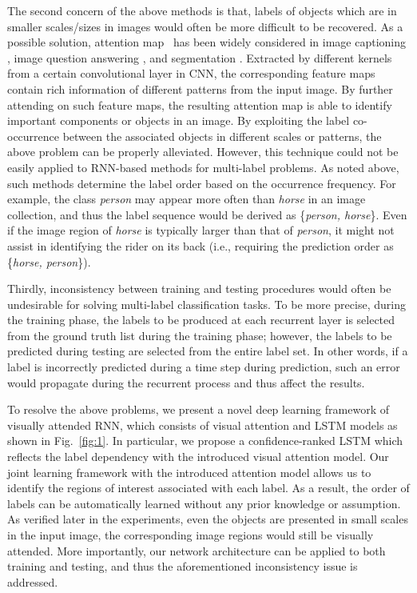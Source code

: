 \documentclass[letterpaper]{article} %
\begin{document}
The second concern of the above methods is that, labels of objects which are in smaller scales/sizes in images would often be more difficult to be recovered. As a possible solution, attention map~\cite{xu2015show} has been widely considered in image captioning \cite{xu2015show}, image question answering \cite{yang2016stacked}, and segmentation \cite{hong2016learning}. Extracted by different kernels from a certain convolutional layer in CNN, the corresponding feature maps contain rich information of different patterns from the input image. By further attending on such feature maps, the resulting attention map is able to identify important components or objects in an image. By exploiting the label co-occurrence between the associated objects in different scales or patterns, the above problem can be properly alleviated. However, this technique could not be easily applied to RNN-based methods for multi-label problems. As noted above, such methods determine the label order based on the occurrence frequency. For example, the class \emph{person} may appear more often than \emph{horse} in an image collection, and thus the label sequence would be derived as \{\emph{person, horse}\}. Even if the image region of \emph{horse} is typically larger than that of \emph{person}, it might not assist in identifying the rider on its back (i.e., requiring the prediction order as \{\emph{horse, person}\}).

Thirdly, inconsistency between training and testing procedures would often be undesirable for solving multi-label classification tasks. To be more precise, during the training phase, the labels to be produced at each recurrent layer is selected from the ground truth list during the training phase; however, the labels to be predicted during testing are selected from the entire label set. In other words, if a label is incorrectly predicted during a time step during prediction, such an error would propagate during the recurrent process and thus affect the results.

To resolve the above problems, we present a novel deep learning framework of visually attended RNN, which consists of visual attention and LSTM models as shown in Fig.~\ref{fig:1}. In particular, we propose a confidence-ranked LSTM which reflects the label dependency with the introduced visual attention model. Our joint learning framework with the introduced attention model allows us to identify the regions of interest associated with each label. As a result, the order of labels can be automatically learned without any prior knowledge or assumption. As verified later in the experiments, even the objects are presented in small scales in the input image, the corresponding image regions would still be visually attended. More importantly, our network architecture can be applied to both training and testing, and thus the aforementioned inconsistency issue is addressed.
\end{document}
